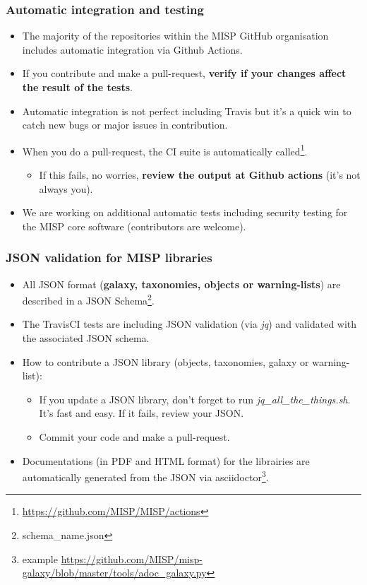 \begin{frame}[fragile]
\frametitle{Automatic integration and testing}
\begin{itemize}
\item The majority of the repositories within the MISP GitHub organisation includes automatic integration via Github Actions.
\item If you contribute and make a pull-request, {\bf verify if your changes affect the result of the tests}.
\item Automatic integration is not perfect including Travis but it's a quick win to catch new bugs or major issues in contribution.
\item When you do a pull-request, the CI suite is automatically called\footnote{\url{https://github.com/MISP/MISP/actions}}.
\begin{itemize}
\item If this fails, no worries, {\bf review the output at Github actions} (it's not always you).
\end{itemize}
\item We are working on additional automatic tests including security testing for the MISP core software (contributors are welcome).
\end{itemize}
\end{frame}

\begin{frame}[fragile]
\frametitle{JSON validation for MISP libraries}
\begin{itemize}
\item All JSON format ({\bf galaxy, taxonomies, objects or warning-lists}) are described in a JSON Schema\footnote{schema\_name.json}.
\item The TravisCI tests are including JSON validation (via \emph{jq}) and validated with the associated JSON schema.
\item How to contribute a JSON library (objects, taxonomies, galaxy or warning-list):
\begin{itemize}
\item If you update a JSON library, don't forget to run \emph{jq\_all\_the\_things.sh}. It's fast and easy. If it fails, review your JSON.
\item Commit your code and make a pull-request.
\end{itemize}
\item Documentations (in PDF and HTML format) for the librairies are automatically generated from the JSON via asciidoctor\footnote{example \url{https://github.com/MISP/misp-galaxy/blob/master/tools/adoc_galaxy.py}}.
\end{itemize}
\end{frame}

